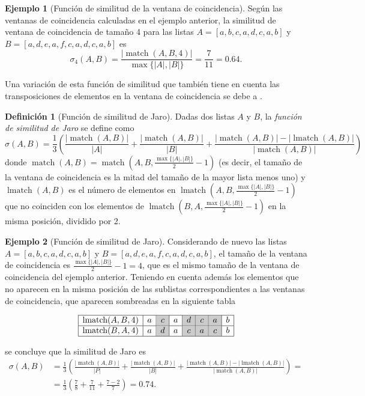 \documentclass[a4paper,10pt,twoside]{article}
\theoremstyle{definition}
\newtheorem{definition}{Definición}
\newtheorem{example}{Ejemplo}
\begin{document}
\begin{example}[Función de similitud de la ventana de coincidencia]
Según las ventanas de coincidencia calculadas en el ejemplo anterior, la similitud de ventana de coincidencia de tamaño 4 para las listas $A=[a,b,c,a,d,c,a,b]$ y $B=[a,d,e,a,f,c,a,d,c,a,b]$ es
\[
\sigma_4(A,B) = \frac{|\operatorname{match}(A,B,4)|}{\max\{|A|,|B|\}} = \frac{7}{11} = 0.64.
\]
\end{example}

Una variación de esta función de similitud que también tiene en cuenta las transposiciones de elementos en la ventana de coincidencia se debe a \cite{jaro1989advances}.

\begin{definition}[Función de similitud de Jaro]
Dadas dos listas $A$ y $B$, la \emph{función de similitud de Jaro} se define como
\[
\sigma(A,B) =
\frac{1}{3}\left(\frac{|\operatorname{match}(A,B)|}{|A|}+\frac{|\operatorname{match}(A,B)|}{|B|}+\frac{|\operatorname{match}(A,B)|-|\operatorname{lmatch}(A,B)|}
{|\operatorname{match}(A,B)|}\right)
\]
donde $\operatorname{match}(A,B)=\operatorname{match}(A,B,\frac{\max\{|A|,|B|\}}{2}-1)$ (es decir, el tamaño de la ventana de
coincidencia es la mitad del tamaño de la mayor lista menos uno) y $\operatorname{lmatch}(A,B)$ es el número de elementos en
$\operatorname{lmatch}(A,B,\allowbreak \frac{\max\{|A|,|B|\}}{2}-1)$ que no coinciden con los elementos de $\operatorname{lmatch}(B,A,\frac{\max\{|A|,|B|\}}{2}-1)$ en la misma posición, dividido por 2.
\end{definition}

\begin{example}[Función de similitud de Jaro]
Considerando de nuevo las listas $A=[a,b,c,a,d,c,a,b]$ y $B=[a,d,e,a,f,c,a,d,c,a,b]$, el tamaño de la ventana de coincidencia es $\frac{\max\{|A|,|B|\}}{2}-1= 4$, que es el mismo tamaño de la ventana de coincidencia del ejemplo anterior. 
Teniendo en cuenta además los elementos que no aparecen en la misma posición de las sublistas correspondientes a las ventanas de coincidencia, que aparecen sombreadas en la siguiente tabla

\[
\begin{array}{|l|c|c|c|c|c|c|c|}
\hline
\textrm{lmatch}(A,B,4) & a & \cellcolor{gray!40}c & a & \cellcolor{gray!40}d & \cellcolor{gray!40}c & \cellcolor{gray!40}a & b\\
\hline
\textrm{lmatch}(B,A,4) & a & \cellcolor{gray!40}d & a & \cellcolor{gray!40}c & \cellcolor{gray!40}a & \cellcolor{gray!40}c & b\\
\hline 
\end{array}
\]

se concluye que la similitud de Jaro es
\begin{align*}
\sigma(A,B) &=
\frac{1}{3}\left(\frac{|\operatorname{match}(A,B)|}{|P|}+\frac{|\operatorname{match}(A,B)|}{|B|}+\frac{|\operatorname{match}(A,B)|-|\operatorname{lmatch}(A,B)|}
{|\operatorname{match}(A,B)|}\right) =\\
&= \frac{1}{3}\left(\frac{7}{8}+\frac{7}{11}+\frac{7-2}{7}\right) = 0.74. 
\end{align*}
\end{example}
\end{document}
